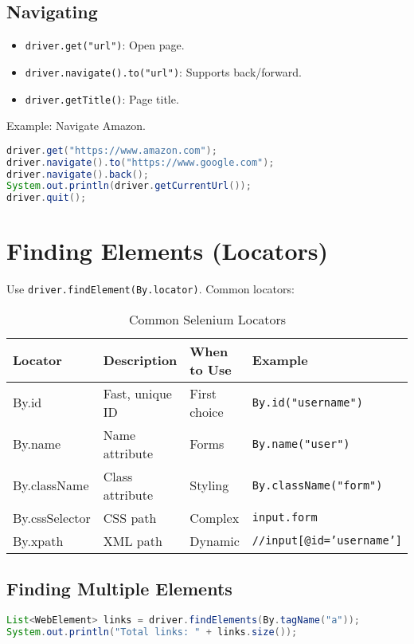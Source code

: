\documentclass[a4paper,12pt]{article}
\begin{document}
\subsection{Navigating}
\begin{itemize}
    \item \texttt{driver.get("url")}: Open page.
    \item \texttt{driver.navigate().to("url")}: Supports back/forward.
    \item \texttt{driver.getTitle()}: Page title.
\end{itemize}

Example: Navigate Amazon.
\begin{lstlisting}[language=Java]
driver.get("https://www.amazon.com");
driver.navigate().to("https://www.google.com");
driver.navigate().back();
System.out.println(driver.getCurrentUrl());
driver.quit();
\end{lstlisting}

\section{Finding Elements (Locators)}

Use \texttt{driver.findElement(By.locator)}. Common locators:

\begin{table}[h]
\centering
\begin{tabular}{l l l l}
\toprule
\textbf{Locator} & \textbf{Description} & \textbf{When to Use} & \textbf{Example} \\
\midrule
By.id & Fast, unique ID & First choice & \texttt{By.id("username")} \\
By.name & Name attribute & Forms & \texttt{By.name("user")} \\
By.className & Class attribute & Styling & \texttt{By.className("form")} \\
By.cssSelector & CSS path & Complex & \texttt{input.form} \\
By.xpath & XML path & Dynamic & \texttt{//input[@id='username']} \\
\bottomrule
\end{tabular}
\caption{Common Selenium Locators}
\end{table}

\subsection{Finding Multiple Elements}
\begin{lstlisting}[language=Java]
List<WebElement> links = driver.findElements(By.tagName("a"));
System.out.println("Total links: " + links.size());
\end{lstlisting}
\end{document}

